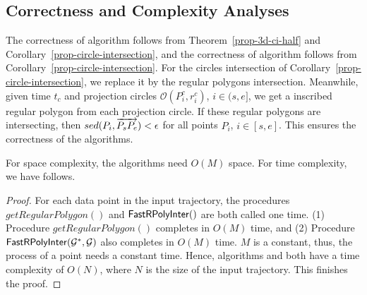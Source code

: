 \subsection{Correctness and Complexity Analyses}

The correctness of algorithm \cist follows from Theorem~\ref{prop-3d-ci-half} and Corollary~\ref{prop-circle-intersection}, and the correctness of algorithm \cista follows from Corollary~\ref{prop-circle-intersection}. For the circles intersection of Corollary~\ref{prop-circle-intersection}, we replace it by the regular polygons intersection.
Meanwhile, given time $t_c$ and projection circles $\mathcal{O}(P^c_i, r^c_i)$, $i \in (s, e]$, we get a inscribed regular polygon from each projection circle.
If these regular polygons are intersecting, then $sed(P_i, \protect\overrightarrow{P_sP_e})<\epsilon$ for all points $P_i$, $i \in [s,e]$.
This ensures the correctness of the algorithms.

{For space complexity, the algorithms need $O(M)$ space.}
For time complexity, we have follows.


\begin{proof}
For each data point in the input trajectory, the procedures $getRegularPolygon()$ and ${\mathsf{FastRPolyInter}}()$ are both called one time.
(1) Procedure $getRegularPolygon()$ completes in $O(M)$ time, and
(2) Procedure ${\mathsf{FastRPolyInter}}(\mathcal{G}^*, \mathcal{G})$ also completes in $O(M)$ time.
$M$ is a constant, thus, the process of a point needs a constant time.
Hence, algorithms \cist and \cista both have a time complexity of $O(N)$, where $N$ is the size of the input trajectory.
This finishes the proof.
\end{proof}



